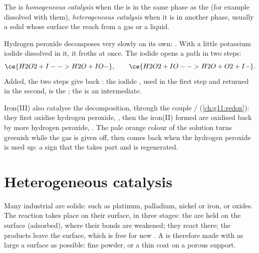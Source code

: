\begin{definition}\label{def:g12:catalysis:homogeneous}
The  is \emph{homogeneous catalysis}
when the  is in the same phase as the  (for example
dissolved with them), \emph{heterogeneous catalysis}
when it is in another phase, usually a solid whose surface
the  reach from a gas or a liquid.
\end{definition}

\begin{example}\label{ex:g12:catalysis:iodide}
Hydrogen peroxide decomposes very slowly on its own:
. With a little potassium iodide dissolved in it,
it froths at once. The iodide  opens a path in two steps:
\[
  \ce{H2O2 + I- -> H2O + IO-}, \qquad
  \ce{H2O2 + IO- -> H2O + O2 + I-} .
\]
Added, the two steps give back : the iodide ,
used in the first step and returned in the second, is the ; the
  is an intermediate.
\end{example}


\begin{example}\label{ex:g12:catalysis:iron}
Iron(III)  also catalyse the decomposition, through the couple
/ (\cref{ch:g11:redox}): they first oxidise
hydrogen peroxide, , then the
iron(II)  formed are oxidised back by more hydrogen peroxide,
. The pale orange colour of
the solution turns greenish while the gas is given off, then comes back
when the hydrogen peroxide is used up: a sign that the  takes part
and is regenerated.
\end{example}

\section{Heterogeneous catalysis}

Many industrial  are solids:  such as platinum, palladium,
nickel or iron, or oxides. The reaction takes place on their surface,
in three stages: the   are held on the surface
(adsorbed), where their bonds are weakened; they react there; the
products leave the surface, which is free for new . A 
is therefore made with as large a surface as possible: fine powder, or a
thin coat on a porous support.

